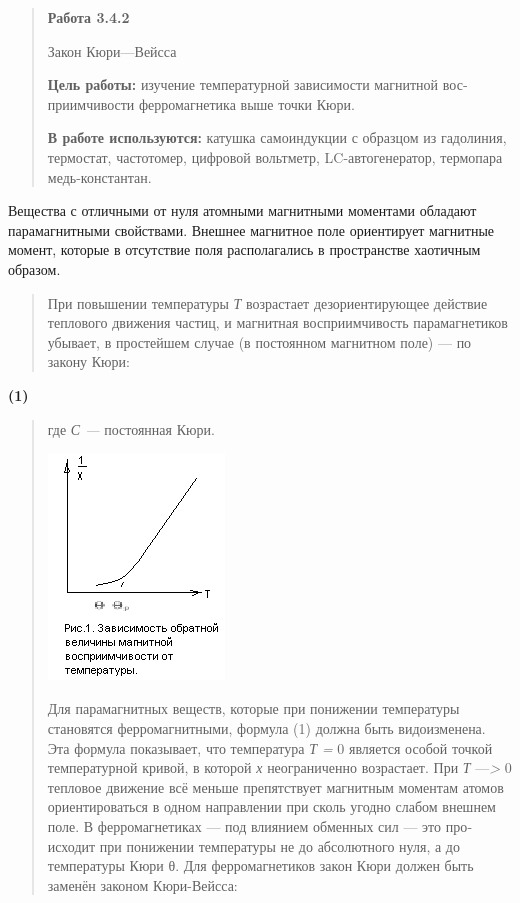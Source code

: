 \documentclass[]{article}
\date{}
\begin{document}
\begin{quote}
\textbf{Работа 3.4.2}

Закон Кюри---Вейсса

\textbf{Цель работы:} изучение температурной зависимости магнитной
вос­приимчивости ферромагнетика выше точки Кюри.

\textbf{В работе используются:} катушка самоиндукции с образ­цом из
гадолиния, термостат, частотомер, цифровой вольтметр, LC-автогенератор,
термопара медь-константан.
\end{quote}

Вещества с отличными от нуля атомными магнитными моментами обладают
парамагнитными свойствами. Внешнее магнитное поле ориен­тирует магнитные
момент, которые в отсутствие поля располагались в пространстве хаотичным
образом.

\begin{quote}
При повышении температуры \emph{Т} возрастает дезориентирующее дей­ствие
теплового движения частиц, и магнитная восприимчивость па­рамагнетиков
убывает, в простейшем случае (в постоянном магнитном поле) --- по закону
Кюри:
\end{quote}

\textbf{(1)}

\begin{quote}
где \emph{С ---} постоянная Кюри.

\includegraphics[width=1.84306in,height=2.37153in]{./media/image2.png}

Для парамагнитных веществ, которые при понижении температуры становятся
ферромагнитными, формула (1) должна быть видоизмене­на. Эта формула
показывает, что температура \emph{Т =} 0 является особой точкой
температурной кривой, в которой \emph{х} неограниченно возрастает. При
\emph{Т} ---\emph{\textgreater{}} 0 тепловое движение всё меньше
препятствует магнитным моментам атомов ори­ентироваться в одном
направлении при сколь угодно слабом внешнем поле. В ферромагнети­ках ---
под влиянием обменных сил --- это про­исходит при понижении температуры
не до абсо­лютного нуля, а до температуры Кюри θ. Для ферромагнетиков
закон Кюри дол­жен быть заменён законом Кюри-Вейсса:
\end{quote}
\end{document}
